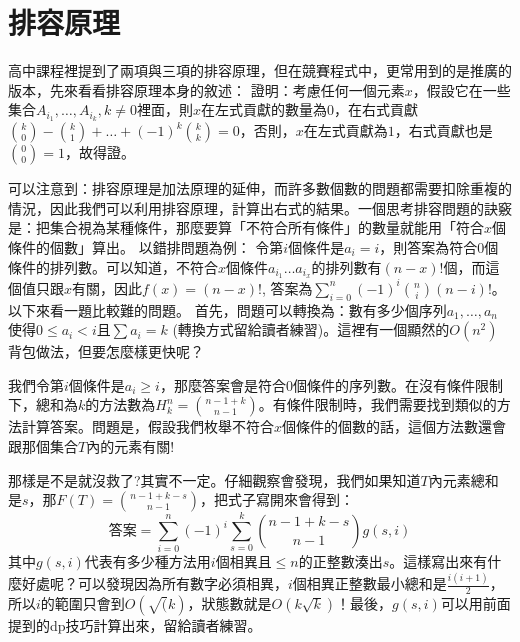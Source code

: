 \section{排容原理}
高中課程裡提到了兩項與三項的排容原理，但在競賽程式中，更常用到的是推廣的版本，先來看看排容原理本身的敘述：
證明：考慮任何一個元素$x$，假設它在一些集合$A_{i_1}, \dots, A_{i_k}, k \neq 0$裡面，則$x$在左式貢獻的數量為$0$，在右式貢獻$\binom{k}{0} - \binom{k}{1} + \dots + (-1)^{k}\binom{k}{k} = 0$，否則，$x$在左式貢獻為$1$，右式貢獻也是$\binom{0}{0} = 1$，故得證。
\\
\par 可以注意到：排容原理是加法原理的延伸，而許多數個數的問題都需要扣除重複的情況，因此我們可以利用排容原理，計算出右式的結果。一個思考排容問題的訣竅是：把集合視為某種條件，那麼要算「不符合所有條件」的數量就能用「符合$x$個條件的個數」算出。
以錯排問題為例：
令第$i$個條件是$a_i = i$，則答案為符合$0$個條件的排列數。可以知道，不符合$x$個條件$a_{i_1} \dots a_{i_x}$的排列數有$(n-x)!$個，而這個值只跟$x$有關，因此$f(x) = (n-x)!$, 答案為$\sum_{i=0}^n (-1)^i \binom{n}{i}(n-i)!$。\\

以下來看一題比較難的問題。
首先，問題可以轉換為：數有多少個序列$a_1, \dots, a_n$使得$0 \leq a_i < i$且$\sum a_i = k$ (轉換方式留給讀者練習)。這裡有一個顯然的$O(n^2)$背包做法，但要怎麼樣更快呢？
\par 我們令第$i$個條件是$a_i \geq i$，那麼答案會是符合$0$個條件的序列數。在沒有條件限制下，總和為$k$的方法數為$H_k^n = \binom{n-1+k}{n-1}$。有條件限制時，我們需要找到類似的方法計算答案。問題是，假設我們枚舉不符合$x$個條件的個數的話，這個方法數還會跟那個集合$T$內的元素有關!
\par 那樣是不是就沒救了?其實不一定。仔細觀察會發現，我們如果知道$T$內元素總和是$s$，那$F(T) = \binom{n-1+k-s}{n-1}$，把式子寫開來會得到：
\[\textbf{答案} = \sum_{i=0}^n (-1)^{i} \sum_{s=0}^k\binom{n-1+k-s}{n-1} g(s, i) \]
其中$g(s, i)$代表有多少種方法用$i$個相異且$\leq n$的正整數湊出$s$。這樣寫出來有什麼好處呢？可以發現因為所有數字必須相異，$i$個相異正整數最小總和是$\frac{i(i+1)}{2}$，所以$i$的範圍只會到$O(\sqrt(k)$，狀態數就是$O(k\sqrt k)$！最後，$g(s, i)$可以用前面提到的dp技巧計算出來，留給讀者練習。





